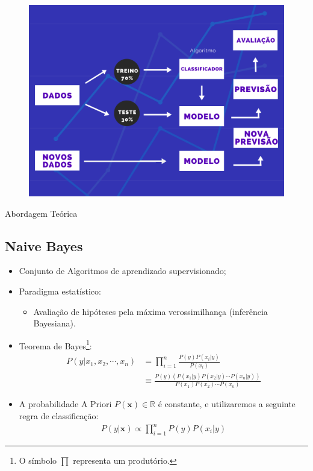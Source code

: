 \documentclass[compress]{beamer}
\begin{document}
\begin{frame}{}
    \begin{figure}
        \centering
        \includegraphics[scale=.39]{img/11.png}
    \end{figure}
\end{frame}

\begin{frame}{Abordagem Teórica}
\subsection{Naive Bayes}
\begin{itemize}
    \item Conjunto de Algoritmos de aprendizado supervisionado;
    \item Paradigma estatístico:
    \begin{itemize}
        \item Avaliação de hipóteses pela máxima verossimilhança (inferência Bayesiana).
    \end{itemize}
    \item Teorema de Bayes\footnote{O símbolo $\prod$ representa um produtório.}: \begin{align}
    P\left(y|x_{1},x_{2},\cdots,x_n\right)&=\prod_{i=1}^{n}\frac{P(y)P(x_i|y)}{P(x_i)}\\
    &\equiv \frac{P(y)\left(P(x_1|y)P(x_2|y)\cdots P(x_n|y)\right)}{P(x_1)P(x_2)\cdots P(x_n)}\nonumber
    \end{align}
    \item A probabilidade A Priori $P(\mathbf{x})\in\mathbb{R}$ é constante, e utilizaremos a seguinte regra de classificação:
    \begin{align}
        P(y|\mathbf{x})\propto \prod_{i=1}^{n}P(y)P(x_i|y)
    \end{align}
\end{itemize}
\end{frame}
\end{document}
